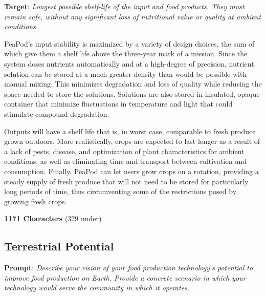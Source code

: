 \documentclass{../tex/report}
\begin{document}
\textbf{Target}: \textit{Longest possible shelf-life of the input and food products. They must remain safe, without any significant loss of nutritional value or quality at ambient conditions.}


PeaPod's input stability is maximized by a variety of design choices, the sum of which give them a shelf life above the three-year mark of a mission. Since the system doses nutrients automatically and at a high-degree of precision, nutrient solution can be stored at a much greater density than would be possible with manual mixing. This minimizes degradation and loss of quality while reducing the space needed to store the solutions. Solutions are also stored in insulated, opaque container that minimize fluctuations in temperature and light that could stimulate compound degradation.

Outputs will have a shelf life that is, in worst case, comparable to fresh produce grown outdoors. More realistically, crops are expected to last longer as a result of a lack of pests, disease, and optimization of plant characteristics for ambient conditions, as well as eliminating time and transport between cultivation and consumption. Finally, PeaPod can let users grow crops on a rotation, providing a steady supply of fresh produce that will not need to be stored for particularly long periods of time, thus circumventing some of the restrictions posed by growing fresh crops.

\uline{\textbf{1171 Characters} (329 under)}


\subsection{Terrestrial Potential}
\label{sec:terrestrial}

\textbf{Prompt}: \textit{Describe your vision of your food production technology’s potential to improve food production on Earth. Provide a concrete scenario in which your technology would serve the community in which it operates.}


\end{document}
